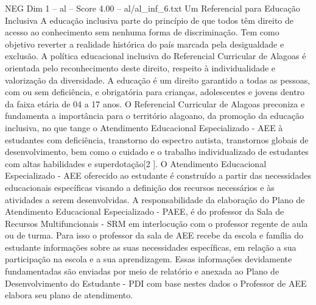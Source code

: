 \begin{textsample}{NEG Dim 1 – al – Score 4.00 – al/al\_inf\_6.txt}  \label{ex:f1_neg_134}
Um Referencial para Educação Inclusiva A educação inclusiva parte do princípio de que todos têm direito de acesso ao conhecimento sem nenhuma forma de discriminação.
Tem como objetivo reverter a realidade histórica do país marcada pela desigualdade e exclusão.
A política educacional inclusiva do Referencial Curricular de Alagoas é orientada pelo reconhecimento deste direito, respeito à individualidade e valorização da diversidade.
A educação é um direito garantido a todas as pessoas, com ou sem deficiência, e obrigatória para crianças, adolescentes e jovens dentro da faixa etária de 04 a 17 anos.
O Referencial Curricular de Alagoas preconiza e fundamenta a importância para o território alagoano, da promoção da educação inclusiva, no que tange o Atendimento Educacional Especializado - AEE à estudantes com deficiência, transtorno do espectro autista, transtornos globais de desenvolvimento, bem como o cuidado e o trabalho individualizado de estudantes com altas habilidades e superdotação[2 ].
O Atendimento Educacional Especializado - AEE oferecido ao estudante é construído a partir das necessidades educacionais específicas visando a definição dos recursos necessários e às atividades a serem desenvolvidas.
A responsabilidade da elaboração do Plano de Atendimento Educacional Especializado - PAEE, é do professor da Sala de Recursos Multifuncionais - SRM em interlocução com o professor regente de aula ou de turma.
Para isso o professor da sala de AEE recebe da escola e família do estudante informações sobre as suas necessidades específicas, em relação a sua participação na escola e a sua aprendizagem.
Essas informações devidamente fundamentadas são enviadas por meio de relatório e anexada ao Plano de Desenvolvimento do Estudante - PDI com base nestes dados o Professor de AEE elabora seu plano de atendimento.

\end{textsample}
